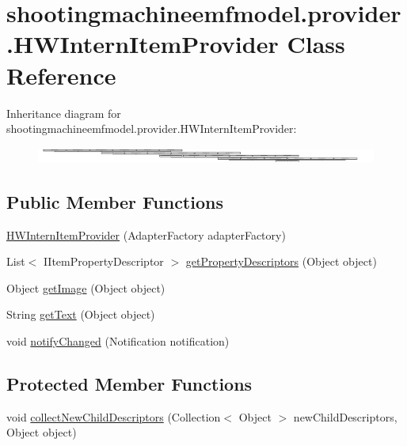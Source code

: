 \hypertarget{classshootingmachineemfmodel_1_1provider_1_1_h_w_intern_item_provider}{\section{shootingmachineemfmodel.\-provider.\-H\-W\-Intern\-Item\-Provider Class Reference}
\label{classshootingmachineemfmodel_1_1provider_1_1_h_w_intern_item_provider}
}
Inheritance diagram for shootingmachineemfmodel.\-provider.\-H\-W\-Intern\-Item\-Provider\-:\begin{figure}[H]
\begin{center}
\leavevmode
\includegraphics[height=0.534759cm]{classshootingmachineemfmodel_1_1provider_1_1_h_w_intern_item_provider}
\end{center}
\end{figure}
\subsection*{Public Member Functions}
\begin{DoxyCompactItemize}
\item 
\hyperlink{classshootingmachineemfmodel_1_1provider_1_1_h_w_intern_item_provider_a354608885547fc33cd57de674a9a327a}{H\-W\-Intern\-Item\-Provider} (Adapter\-Factory adapter\-Factory)
\item 
List$<$ I\-Item\-Property\-Descriptor $>$ \hyperlink{classshootingmachineemfmodel_1_1provider_1_1_h_w_intern_item_provider_aebcedc7b61c3efa359f2a5825e622699}{get\-Property\-Descriptors} (Object object)
\item 
Object \hyperlink{classshootingmachineemfmodel_1_1provider_1_1_h_w_intern_item_provider_a2e0b827982b097930b2e346c5fd7239e}{get\-Image} (Object object)
\item 
String \hyperlink{classshootingmachineemfmodel_1_1provider_1_1_h_w_intern_item_provider_afa379bf18f4ee04826775ee13be88b3c}{get\-Text} (Object object)
\item 
void \hyperlink{classshootingmachineemfmodel_1_1provider_1_1_h_w_intern_item_provider_ae97d4d5ff5ba40e30934cc734cec28bc}{notify\-Changed} (Notification notification)
\end{DoxyCompactItemize}
\subsection*{Protected Member Functions}
\begin{DoxyCompactItemize}
\item 
void \hyperlink{classshootingmachineemfmodel_1_1provider_1_1_h_w_intern_item_provider_aaf81beae15af9c64a0b611b78de60d5a}{collect\-New\-Child\-Descriptors} (Collection$<$ Object $>$ new\-Child\-Descriptors, Object object)
\end{DoxyCompactItemize}


